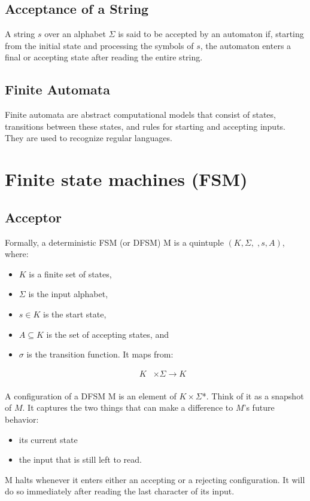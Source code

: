 \documentclass{article}
\begin{document}
\subsection{Acceptance of a String}
A string $s$ over an alphabet $\Sigma$ is said to be accepted by an automaton
if, starting from the initial state and processing the symbols of $s$, the
automaton enters a final or accepting state after reading the entire string.

\subsection{Finite Automata}
Finite automata are abstract computational models that consist of states,
transitions between these states, and rules for starting and accepting inputs.
They are used to recognize regular languages.


\section{Finite state machines (FSM)}

\subsection{Acceptor}

Formally, a deterministic FSM (or DFSM) M is a quintuple $(K, \Sigma, , s, A)$,
where: 



\begin{itemize} 
\item $K$ is a finite set of states,
\item $\Sigma$ is the input alphabet, 
\item $s \in K$ is the start state, 
\item $A \subseteq K$ is the set of accepting states, and 
\item $\sigma$ is the transition function. It maps from:

		\begin{align*} K &\times \Sigma \to K \\ \end{align*}

\end{itemize}

A configuration of a DFSM M is an element of $K \times \Sigma$*. Think of it as a snapshot
of $M$. It captures the two things that can make a difference to $M$’s future
behavior:
\begin{itemize}
		\item its current state 
		\item the input that is still left to read.
\end{itemize}
M halts whenever it enters either an accepting or a rejecting configuration. It
will do so immediately after reading the last character of its input.
\end{document}
